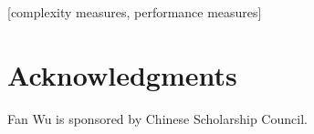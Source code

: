 \documentclass{sig-alternate}
\begin{document}
[complexity measures, performance measures]













\section{Acknowledgments}
Fan Wu is sponsored by Chinese Scholarship Council.

%

%
%

\balancecolumns
\end{document}
